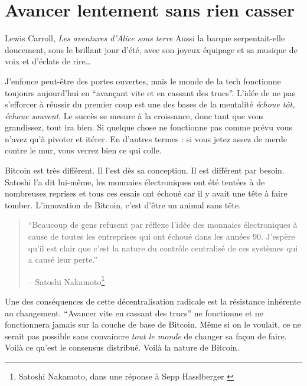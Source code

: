 \chapter{Avancer lentement sans rien casser}
\label{les:18}

\begin{chapquote}{Lewis Carroll, \textit{Les aventures d'Alice sous terre}}
Aussi la barque serpentait-elle doucement, sous le brillant jour d’été, avec son
joyeux équipage et sa musique de voix et d’éclats de rire\ldots
\end{chapquote}

J'enfonce peut-être des portes ouvertes, mais le monde de la tech fonctionne
toujours aujourd'hui en \enquote{avançant vite et en cassant des trucs}. L'idée
de ne pas s'efforcer à réussir du premier coup est une des bases de la mentalité
\textit{échoue tôt, échoue souvent}. Le succès se mesure à la croissance, donc
tant que vous grandissez, tout ira bien. Si quelque chose ne fonctionne pas
comme prévu vous n'avez qu'à pivoter et itérer. En d'autres termes : si vous
jetez assez de merde contre le mur, vous verrez bien ce qui colle.

Bitcoin est très différent. Il l'est dès sa conception. Il est différent par
besoin. Satoshi l'a dit lui-même, les monnaies électroniques ont été tentées à
de nombreuses reprises et tous ces essais ont échoué car il y avait une tête à
faire tomber. L'innovation de Bitcoin, c'est d'être un animal sans tête.

\begin{quotation}\begin{samepage}
\enquote{Beaucoup de gens refusent par réflexe l'idée des monnaies électroniques
à cause de toutes les entreprises qui ont échoué dans les années 90. J'espère
qu'il est clair que c'est la nature du contrôle centralisé de ces systèmes qui a
causé leur perte.}
\begin{flushright} -- Satoshi Nakamoto\footnote{Satoshi Nakamoto, dans une
réponse à Sepp Hasslberger \cite{satoshi-centralized-nature}}
\end{flushright}\end{samepage}\end{quotation}

Une des conséquences de cette décentralisation radicale est la résistance
inhérente au changement. \enquote{Avancer vite en cassant des trucs} ne
fonctionne et ne fonctionnera jamais sur la couche de base de Bitcoin. Même si
on le voulait, ce ne serait pas possible sans convaincre \textit{tout le monde}
de changer sa façon de faire. Voilà ce qu'est le consensus distribué. Voilà la
nature de Bitcoin.

